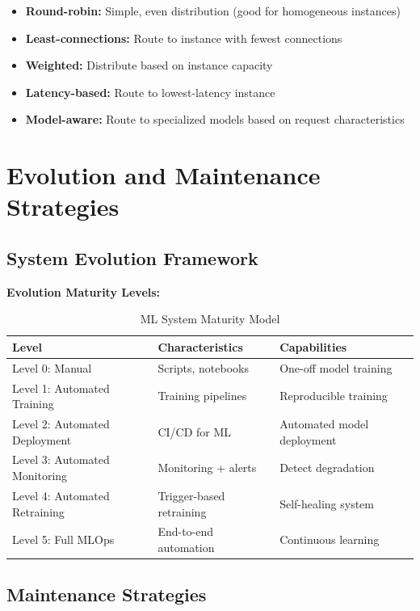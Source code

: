 \begin{itemize}
    \item \textbf{Round-robin:} Simple, even distribution (good for homogeneous instances)
    \item \textbf{Least-connections:} Route to instance with fewest connections
    \item \textbf{Weighted:} Distribute based on instance capacity
    \item \textbf{Latency-based:} Route to lowest-latency instance
    \item \textbf{Model-aware:} Route to specialized models based on request characteristics
\end{itemize}

\section{Evolution and Maintenance Strategies}

\subsection{System Evolution Framework}

\textbf{Evolution Maturity Levels:}

\begin{table}[h]
\centering
\caption{ML System Maturity Model}
\begin{tabular}{p{2cm}p{4cm}p{5cm}}
\toprule
\textbf{Level} & \textbf{Characteristics} & \textbf{Capabilities} \\
\midrule
Level 0: Manual & Scripts, notebooks & One-off model training \\
\midrule
Level 1: Automated Training & Training pipelines & Reproducible training \\
\midrule
Level 2: Automated Deployment & CI/CD for ML & Automated model deployment \\
\midrule
Level 3: Automated Monitoring & Monitoring + alerts & Detect degradation \\
\midrule
Level 4: Automated Retraining & Trigger-based retraining & Self-healing system \\
\midrule
Level 5: Full MLOps & End-to-end automation & Continuous learning \\
\bottomrule
\end{tabular}
\end{table}

\subsection{Maintenance Strategies}

